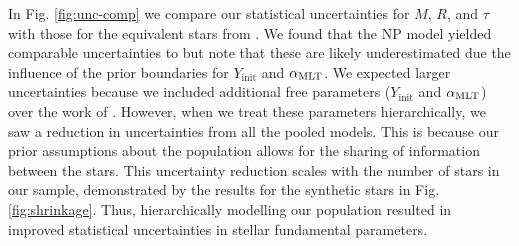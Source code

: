 In Fig. \ref{fig:unc-comp} we compare our statistical uncertainties for $M$, $R$, and $\tau$ with those for the equivalent stars from . We found that the NP model yielded comparable uncertainties to  but note that these are likely underestimated due the influence of the prior boundaries for $Y_\mathrm{init}$ and ${\alpha_\mathrm{MLT}}$. We expected larger uncertainties because we included additional free parameters ($Y_\mathrm{init}$ and ${\alpha_\mathrm{MLT}}$) over the work of . However, when we treat these parameters hierarchically, we saw a reduction in uncertainties from all the pooled models. This is because our prior assumptions about the population allows for the sharing of information between the stars. This uncertainty reduction scales with the number of stars in our sample, demonstrated by the results for the synthetic stars in Fig. \ref{fig:shrinkage}. Thus, hierarchically modelling our population resulted in improved statistical uncertainties in stellar fundamental parameters.



